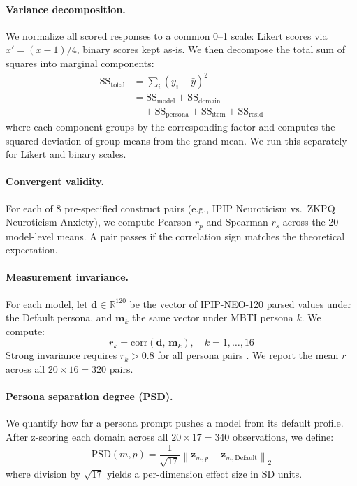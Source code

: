 \documentclass[11pt]{article}
\begin{document}
\paragraph{Variance decomposition.}
We normalize all scored responses to a common 0--1 scale: Likert scores via $x' = (x - 1)/4$, binary scores kept as-is. We then decompose the total sum of squares into marginal components:
\begin{equation}
\begin{split}
\mathrm{SS}_{\mathrm{total}} &= \sum_{i}(y_i - \bar{y})^2 \\
&= \mathrm{SS}_{\mathrm{model}} + \mathrm{SS}_{\mathrm{domain}} \\
&\quad + \mathrm{SS}_{\mathrm{persona}} + \mathrm{SS}_{\mathrm{item}} + \mathrm{SS}_{\mathrm{resid}}
\end{split}
\label{eq:variance}
\end{equation}
where each component groups by the corresponding factor and computes the squared deviation of group means from the grand mean. We run this separately for Likert and binary scales.

\paragraph{Convergent validity.}
For each of 8 pre-specified construct pairs (e.g., IPIP Neuroticism vs.\ ZKPQ Neuroticism-Anxiety), we compute Pearson $r_p$ and Spearman $r_s$ across the 20 model-level means. A pair passes if the correlation sign matches the theoretical expectation.

\paragraph{Measurement invariance.}
For each model, let $\mathbf{d} \in \mathbb{R}^{120}$ be the vector of IPIP-NEO-120 parsed values under the Default persona, and $\mathbf{m}_k$ the same vector under MBTI persona $k$. We compute:
\begin{equation}
r_k = \mathrm{corr}(\mathbf{d},\, \mathbf{m}_k), \quad k = 1, \ldots, 16
\label{eq:invariance}
\end{equation}
Strong invariance requires $r_k > 0.8$ for all persona pairs \citep{vandenberg2000review, meredith1993measurement}. We report the mean $r$ across all $20 \times 16 = 320$ pairs.

\paragraph{Persona separation degree (PSD).}
We quantify how far a persona prompt pushes a model from its default profile. After z-scoring each domain across all $20 \times 17 = 340$ observations, we define:
\begin{equation}
\mathrm{PSD}(m, p) = \frac{1}{\sqrt{17}}\left\| \mathbf{z}_{m,p} - \mathbf{z}_{m,\mathrm{Default}} \right\|_2
\label{eq:psd}
\end{equation}
where division by $\sqrt{17}$ yields a per-dimension effect size in SD units.
\end{document}
